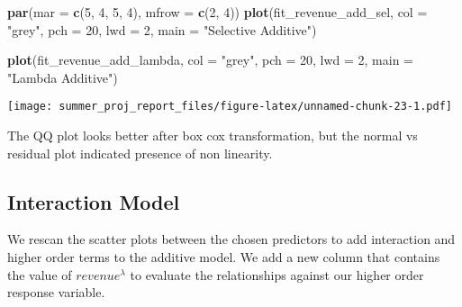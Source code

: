 \documentclass[
]{article}
\newenvironment{Shaded}{\begin{snugshade}}{\end{snugshade}}
\newcommand{\CommentTok}[1]{\textcolor[rgb]{0.56,0.35,0.01}{\textit{#1}}}
\newcommand{\DataTypeTok}[1]{\textcolor[rgb]{0.13,0.29,0.53}{#1}}
\newcommand{\DecValTok}[1]{\textcolor[rgb]{0.00,0.00,0.81}{#1}}
\newcommand{\KeywordTok}[1]{\textcolor[rgb]{0.13,0.29,0.53}{\textbf{#1}}}
\newcommand{\NormalTok}[1]{#1}
\newcommand{\OperatorTok}[1]{\textcolor[rgb]{0.81,0.36,0.00}{\textbf{#1}}}
\newcommand{\StringTok}[1]{\textcolor[rgb]{0.31,0.60,0.02}{#1}}
\begin{document}
\begin{Shaded}
\begin{Highlighting}[]
\KeywordTok{par}\NormalTok{(}\DataTypeTok{mar =} \KeywordTok{c}\NormalTok{(}\DecValTok{5}\NormalTok{, }\DecValTok{4}\NormalTok{, }\DecValTok{5}\NormalTok{, }\DecValTok{4}\NormalTok{), }\DataTypeTok{mfrow =} \KeywordTok{c}\NormalTok{(}\DecValTok{2}\NormalTok{, }\DecValTok{4}\NormalTok{))}
\KeywordTok{plot}\NormalTok{(fit_revenue_add_sel,}
    \DataTypeTok{col =} \StringTok{"grey"}\NormalTok{,}
    \DataTypeTok{pch =} \DecValTok{20}\NormalTok{,}
    \DataTypeTok{lwd =} \DecValTok{2}\NormalTok{,}
    \DataTypeTok{main =} \StringTok{"Selective Additive"}\NormalTok{)}

\KeywordTok{plot}\NormalTok{(fit_revenue_add_lambda,}
    \DataTypeTok{col =} \StringTok{"grey"}\NormalTok{,}
    \DataTypeTok{pch =} \DecValTok{20}\NormalTok{,}
    \DataTypeTok{lwd =} \DecValTok{2}\NormalTok{,}
    \DataTypeTok{main =} \StringTok{"Lambda Additive"}\NormalTok{)}
\end{Highlighting}
\end{Shaded}

\texttt{[image: summer\_proj\_report\_files/figure-latex/unnamed-chunk-23-1.pdf]}

The QQ plot looks better after box cox transformation, but the normal vs
residual plot indicated presence of non linearity.

\hypertarget{interaction-model}{%
\subsection{Interaction Model}\label{interaction-model}}

We rescan the scatter plots between the chosen predictors to add
interaction and higher order terms to the additive model. We add a new
column that contains the value of \(revenue ^ \lambda\) to evaluate the
relationships against our higher order response variable.

\begin{Shaded}
\end{Shaded}
\end{document}
